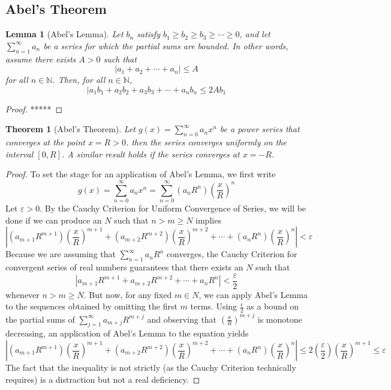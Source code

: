 \documentclass[10pt]{report}
\newtheorem{thm3}{Theorem}[subsection]
\newtheorem{lem3}{Lemma}[subsection]
\newcommand{\eps}{\varepsilon}
\begin{document}
\subsection{Abel's Theorem}
\begin{lem3}[Abel's Lemma]
Let $b_n$ satisfy $b_1\geq b_2 \geq b_3 \geq \cdots \geq 0$, and let $\sum_{n=1}^\infty a_n$ be a series for which the partial sums are bounded. In other words, assume there exists $A>0$ such that
$$|a_1 + a_2 + \cdots + a_n|\leq A$$
for all $n\in\mathbb{N}$. Then, for all $n\in\mathbb{N}$,
$$|a_1b_1 + a_2b_2 + a_3b_3 + \cdots + a_nb_n\leq 2Ab_1$$
\end{lem3}
\begin{proof}
*****
\end{proof}
\begin{thm3}[Abel's Theorem]
Let $g(x) = \sum_{n=0}^\infty a_nx^n$ be a power series that converges at the point $x= R>0$. then the series converges uniformly on the interval $[0,R]$. A similar result holds if the series converges at $x=-R$.
\end{thm3}
\begin{proof}
To set the stage for an application of Abel's Lemma, we first write
$$g(x) = \sum_{n=0}^\infty a_nx^n = \sum_{n=0}^\infty (a_nR^n)\left(\frac{x}{R}\right)^n$$
Let $\eps>0$. By the Cauchy Criterion for Uniform Convergence of Series, we will be done if we can produce an $N$ such that $n>m\geq N$ implies
$$\left|(a_{m+1}R^{m+1})\left(\frac{x}{R}\right)^{m+1}+(a_{m+2}R^{m+2}) \left(\frac{x}{R}\right)^{m+2} +\cdots + (a_nR^n)\left(\frac{x}{R}\right)^n\right|<\eps$$
Because we are assuming that $\sum_{n=1}^\infty a_nR^n$ converges, the Cauchy Criterion for convergent series of real numbers guarantees that there exists an $N$ such that
$$|a_{m+1}R^{m+1}+a_{m+2}R^{m+2}+\cdots +a_nR^n|<\frac{\eps}{2}$$
whenever $n>m\geq N$. But now, for any fixed $m\in N$, we can apply Abel's Lemma to the sequences obtained by omitting the first $m$ terms. Using $\frac{\epsilon}{2}$ as a bound on the partial sums of $\sum_{j=1}^\infty a_{m+j}R^{m+j}$ and observing that $\left(\frac{x}{R}\right)^{m+j}$ is monotone decreasing, an application of Abel's Lemma to the equation yields
$$\left|(a_{m+1}R^{m+1})\left(\frac{x}{R}\right)^{m+1}+(a_{m+2}R^{m+2}) \left(\frac{x}{R}\right)^{m+2} +\cdots + (a_nR^n)\left(\frac{x}{R}\right)^n\right|\leq 2\left(\frac{\eps}{2}\right)\left(\frac{x}{R}\right)^{m+1}\leq\eps$$
The fact that the inequality is not strictly (as the Cauchy Criterion technically requires) is a distraction but not a real deficiency. 
\end{proof}
\end{document}
